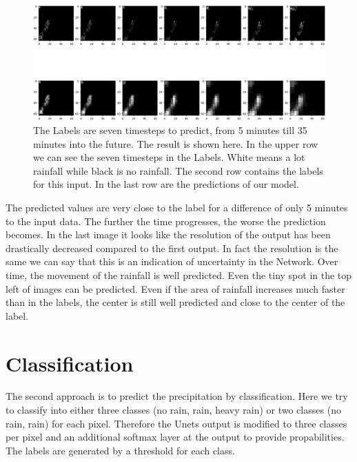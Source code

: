 \documentclass[oneside]{htwg-report}
\begin{document}
\begin{figure}[ht]
\centering
\includegraphics[width=\linewidth]{../pics/t5}
\caption{The Labels are seven timesteps to predict, from 5 minutes till 35 minutes into the future. The result is shown here. In the upper row we can see the seven timesteps in the Labels. White means a lot rainfall while black is no rainfall.
The second row contains the labels for this input. In the last row are the predictions of our model.}
\end{figure}

The predicted values are very close to the label for a difference of only 5 minutes to the input data. The further the time progresses, the worse the prediction becomes.
In the last image it looks like the resolution of the output has been drastically decreased compared to the first output. 
In fact the resolution is the same we can say that this is an indication of uncertainty in the Network.
Over time, the movement of the rainfall is well predicted. Even the tiny spot in the top left of images can be predicted.
Even if the area of rainfall increases much faster than in the labels, the center is still well predicted and close to the center of the label.

\section*{Classification}
The second approach is to predict the precipitation by classification. Here we try to classify into either three classes (no rain, rain, heavy rain) or two classes (no rain, rain) for each pixel.
Therefore the Unets output is modified to three classes per pixel and an additional softmax layer at the output to provide propabilities. The labels are generated by a threshold for each class.
\end{document}

